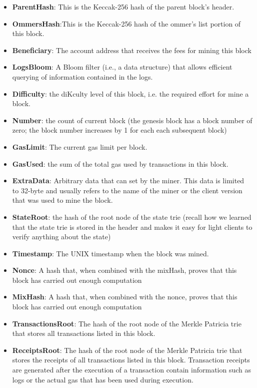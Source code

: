         \begin{itemize}
            \item \textbf{ParentHash}: This is the Keccak-256 hash of the parent block's header.
            \item \textbf{OmmersHash}:This is the Keccak-256 hash of the ommer's list portion of this block.
            \item \textbf{Beneficiary}: The account address that receives the fees for mining this block
            \item \textbf{LogsBloom}: A Bloom filter (i.e., a data structure) that allows efficient querying of information contained in the logs.
            \item \textbf{Difficulty}: the diKculty level of this block, i.e. the required effort for mine a block.
            \item \textbf{Number}:  the count of current block (the genesis block has a block
            number of zero; the block number increases by 1 for each each
            subsequent block)
            \item \textbf{GasLimit}: The current gas limit per block.
            \item \textbf{GasUsed}: the sum of the total gas used by transactions in this block.
            \item \textbf{ExtraData}: Arbitrary data that can set by the miner. This data is limited to 32-byte and usually refers to the name of the miner or the client version that was used to
            mine the block.
            \item \textbf{StateRoot}: the hash of the root node of the state trie (recall how we
            learned that the state trie is stored in the header and makes it easy
            for light clients to verify anything about the state)
            \item \textbf{Timestamp}: The UNIX timestamp when the block was mined.
            \item \textbf{Nonce}: A hash that, when combined with the mixHash, proves that this block has carried out enough computation
            \item \textbf{MixHash}: A hash that, when combined with the nonce, proves that
            this block has carried out enough computation
            \item \textbf{TransactionsRoot}: The hash of the root node of the Merkle Patricia trie that stores all transactions listed in this block.
            \item \textbf{ReceiptsRoot}: The hash of the root node of the Merkle Patricia trie that stores the receipts of all transactions listed in this block.
                Transaction receipts are generated after the execution of a transaction contain information such as logs or the actual gas that has been used during execution.

        \end{itemize}

